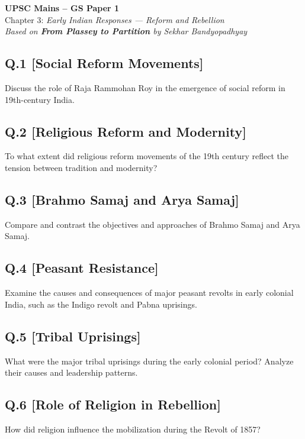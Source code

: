\begin{center}
    \Large\textbf{UPSC Mains – GS Paper 1}\\
    \normalsize Chapter 3: \textit{Early Indian Responses — Reform and Rebellion}\\
    \vspace{0.5em}
    \textit{Based on \textbf{From Plassey to Partition} by Sekhar Bandyopadhyay}
\end{center}

\vspace{1em}

\subsection*{Q.1 [Social Reform Movements]}
Discuss the role of Raja Rammohan Roy in the emergence of social reform in 19th-century India.

\subsection*{Q.2 [Religious Reform and Modernity]}
To what extent did religious reform movements of the 19th century reflect the tension between tradition and modernity?

\subsection*{Q.3 [Brahmo Samaj and Arya Samaj]}
Compare and contrast the objectives and approaches of Brahmo Samaj and Arya Samaj.

\subsection*{Q.4 [Peasant Resistance]}
Examine the causes and consequences of major peasant revolts in early colonial India, such as the Indigo revolt and Pabna uprisings.

\subsection*{Q.5 [Tribal Uprisings]}
What were the major tribal uprisings during the early colonial period? Analyze their causes and leadership patterns.

\subsection*{Q.6 [Role of Religion in Rebellion]}
How did religion influence the mobilization during the Revolt of 1857?

